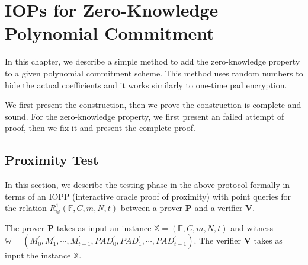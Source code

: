 \chapter{IOPs for Zero-Knowledge Polynomial Commitment}

In this chapter, we describe a simple method to add the zero-knowledge property to a given polynomial commitment scheme. This method uses random numbers to hide the actual coefficients and it works similarly to one-time pad encryption.

We first present the construction, then we prove the construction is complete and sound. For the zero-knowledge property, we first present an failed attempt of proof, then we fix it and present the complete proof.

\section{Proximity Test}

In this section, we describe the testing phase in the above protocol formally in terms of an IOPP (interactive oracle proof of proximity) with point queries for the relation $R_\otimes^1(\mathbb{F}, C, m, N, t)$ between a prover $\textbf{P}$ and a verifier $\textbf{V}$.

The prover $\textbf{P}$ takes as input an instance $\mathbb{X} = (\mathbb{F}, C, m, N, t)$ and witness $\mathbb{W} = (M_0^{\prime}, M_1^{\prime}, \cdots, M_{t-1}^{\prime}, PAD_0^{\prime}, PAD_1^{\prime}, \cdots, PAD_{t-1}^{\prime})$. The verifier $\textbf{V}$ takes as input the instance $\mathbb{X}$.

